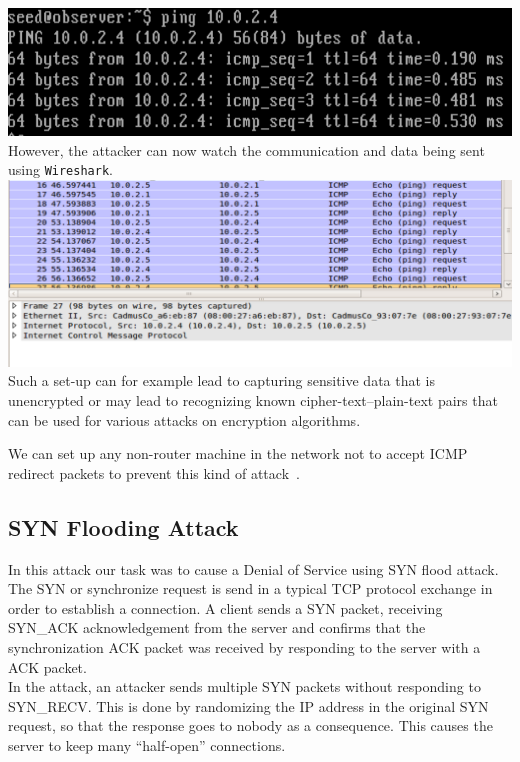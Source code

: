 \documentclass[12pt, a4paper, pdflatex]{article}
\begin{document}
\includegraphics[width=.95\textwidth]{gfx/imcp-ping}\\

However, the attacker can now watch the communication and data being sent using \texttt{Wireshark}.\\

\includegraphics[width=.95\textwidth]{gfx/imcp-shark}\\

Such a set-up can for example lead to capturing sensitive data that is unencrypted or may lead to recognizing known cipher-text--plain-text pairs that can be used for various attacks on encryption algorithms.

We can set up any non-router machine in the network not to accept ICMP redirect packets to prevent this kind of attack~\cite{imcp}.

\subsection{SYN Flooding Attack}

In this attack our task was to cause a Denial of Service using SYN flood attack. The SYN or synchronize request is send in a typical TCP protocol exchange in order to establish a connection. A client sends a SYN packet, receiving SYN\_ACK acknowledgement from the server and confirms that the synchronization ACK packet was received by responding to the server with a ACK packet.\\

In the attack, an attacker sends multiple SYN packets without responding to SYN\_RECV. This is done by randomizing the IP address in the original SYN request, so that the response goes to nobody as a consequence. This causes the server to keep many ``half-open'' connections.\\
\end{document}
